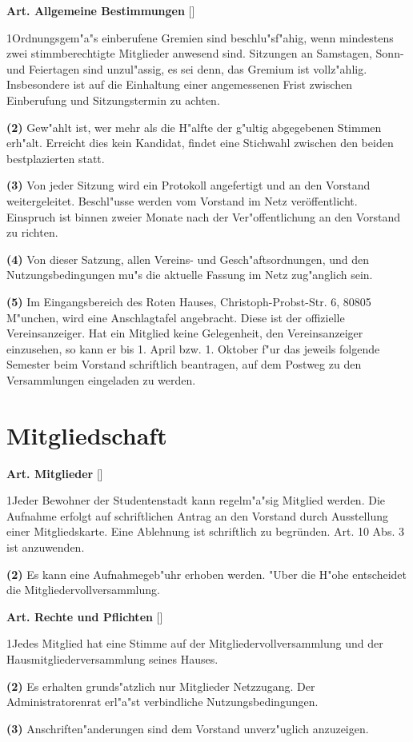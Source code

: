 \documentclass[12pt]{article}
\newcommand{\Abschnitt}[1]{\section{#1}}
\newcommand{\Satz}[2]{

\begin{samepage}
{\bf (#1)} #2
\end{samepage}
}
\newenvironment{Artikel}[2]{
\bigskip \centerline{{\bf Art. #1} [#2]}
\nopagebreak
}{
}
\begin{document}
\begin{Artikel}{5}{Allgemeine Bestimmungen}

\Satz{1}{Ordnungsgem"a"s einberufene Gremien sind beschlu"sf"ahig, wenn
mindestens zwei stimmberechtigte Mitglieder anwesend sind. Sitzungen an 
Samstagen, Sonn- und Feiertagen sind unzul"assig, es sei denn, das Gremium 
ist vollz"ahlig. Insbesondere ist auf die Einhaltung einer angemessenen
Frist zwischen Einberufung und Sitzungstermin zu achten.}

\Satz{2}{Gew"ahlt ist, wer mehr als die H"alfte der g"ultig abgegebenen
Stimmen erh"alt. Erreicht dies kein Kandidat, findet eine Stichwahl zwischen
den beiden bestplazierten statt.}

\Satz{3}{Von jeder Sitzung wird ein Protokoll angefertigt und an den 
Vorstand weitergeleitet. Beschl"usse werden vom Vorstand im Netz
veröffentlicht. Einspruch ist binnen zweier Monate nach der Ver"offentlichung
an den Vorstand zu richten.}

\Satz{4}{Von dieser Satzung, allen Vereins- und Gesch"aftsordnungen, 
und den Nutzungsbedingungen mu"s die aktuelle Fassung im Netz zug"anglich sein.}

\Satz{5}{Im Eingangsbereich des Roten Hauses, Christoph-Probst-Str. 6,
80805 M"un\-chen, wird eine Anschlagtafel angebracht. Diese ist der 
offizielle Vereinsanzeiger. Hat ein Mitglied keine Gelegenheit, den 
Vereinsanzeiger einzusehen, so kann er bis 1. April bzw. 1. Oktober f"ur das 
jeweils folgende Semester beim Vorstand schriftlich beantragen, auf dem 
Postweg zu den Versammlungen eingeladen zu werden.}

\end{Artikel}

\Abschnitt{Mitgliedschaft}

\begin{Artikel}{6}{Mitglieder}

\Satz{1}{Jeder Bewohner der Studentenstadt kann regelm"a"sig Mitglied werden. 
Die Aufnahme erfolgt auf schriftlichen Antrag an den Vorstand durch 
Ausstellung einer Mitgliedskarte. Eine Ablehnung ist schriftlich zu begründen.
Art. 10 Abs. 3 ist anzuwenden.}

\Satz{2}{Es kann eine Aufnahmegeb"uhr erhoben werden. "Uber die H"ohe
entscheidet die Mitgliedervollversammlung.}

\end{Artikel}

\begin{Artikel}{7}{Rechte und Pflichten}

\Satz{1}{Jedes Mitglied hat eine Stimme auf der Mitgliedervollversammlung 
und der Hausmitgliederversammlung seines Hauses.}

\Satz{2}{Es erhalten grunds"atzlich nur Mitglieder Netzzugang. Der 
Administratorenrat erl"a"st verbindliche Nutzungsbedingungen.}

\Satz{3}{Anschriften"anderungen sind dem Vorstand unverz"uglich anzuzeigen.}

\end{Artikel}
\end{document}
